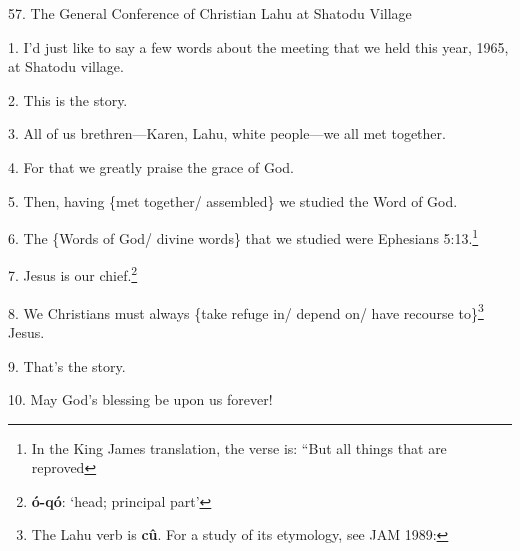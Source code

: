 
57. The General Conference of Christian Lahu at Shatodu Village

1. I'd just like to say a few words  about the meeting that we held this year,
1965, at Shatodu village.

2. This is the story.

3. All of us brethren---Karen, Lahu, white people---we all met together.

4. For that we greatly praise the grace of God.

5. Then, having \{met together/ assembled\} we studied the Word of God.

6. The \{Words of God/ divine words\} that we studied were Ephesians 5:13.\footnote{In the King James translation, the verse is: ``But all things that are reproved}

7. Jesus is our chief.\footnote{\textbf{ó-qó}: `head; principal part'}

8. We Christians must always \{take refuge in/ depend on/ have recourse to\}\footnote{The Lahu verb is \textbf{cû}. For a study of its etymology, see JAM 1989:}
Jesus.

9. That's the story.

10. May God's blessing be upon us forever!

